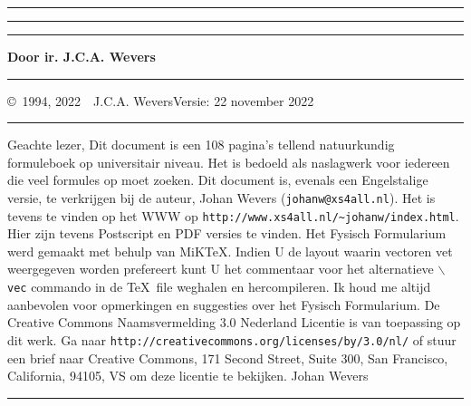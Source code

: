 \documentclass[twoside]{report}
\makeatletter
\newlength{\@x}
\makeatother
\begin{document}
\thispagestyle{empty}
\setcounter{page}{0}
\hrule
\rule{.4pt}{22.85cm}\hspace*{154mm}\rule{.4pt}{22.85cm}
\vspace*{-18cm}
\begin{center}
\Huge
{}
\end{center}
\vspace{2cm}
\centerline{\Large\bf Door ir. J.C.A. Wevers}
\vspace{2cm}
\vfill
\hrule
\newpage
\thispagestyle{empty}
\copyright~1994, 2022~~J.C.A. Wevers\hfill Versie: 22 november 2022
\npar
\hrule
\par
\bigskip
Geachte lezer,
\npar
Dit document is een 108 pagina's tellend natuurkundig formuleboek op
universitair niveau. Het is bedoeld als naslagwerk voor iedereen die veel
formules op moet zoeken.
\npar
Dit document is, evenals een Engelstalige versie, te verkrijgen bij de
auteur, Johan Wevers\linebreak
({\tt johanw@xs4all.nl}).
\npar
Het is tevens te vinden op het WWW op {\tt http://www.xs4all.nl/\~{}johanw/index.html}.
Hier zijn tevens Postscript en PDF versies te vinden.
\npar
Het Fysisch Formularium werd gemaakt met behulp van MiK\TeX.
\npar
Indien U de layout waarin vectoren vet weergegeven worden prefereert kunt U
het commentaar voor het alternatieve {\tt $\backslash$vec} commando in de
\TeX\ file weghalen en hercompileren.
\npar
Ik houd me altijd aanbevolen voor opmerkingen en suggesties over het Fysisch
Formularium.
\npar
De Creative Commons Naamsvermelding 3.0 Nederland Licentie is van toepassing op dit werk.
Ga naar {\tt http://creativecommons.org/licenses/by/3.0/nl/} of stuur een brief naar Creative Commons,
171 Second Street, Suite 300, San Francisco, California, 94105, VS om deze licentie te bekijken.
\npar
Johan Wevers
\vfill
\hrule
\newpage

\tableofcontents
\newpage

\end{document}
